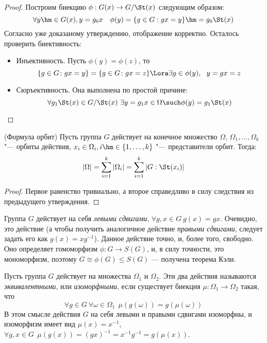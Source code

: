 \begin{proof}
	Построим биекцию $\phi: G(x) \to G / \St(x)$ следующим образом: 
	\[
		\forall y \hm\in G(x), y = g_0x \quad \phi(y) = \{g \in G: gx = y\} \hm= g_0\St(x)
	\]
	Согласно уже доказаному утверждению, отображение корректно. Осталось проверить биективность:
	\begin{itemize}
		\item Инъективность. Пусть $\phi(y) = \phi(z)$, то
		\[
			\{g \in G \colon gx = y\} = \{g \in G \colon gx = z\} \Lora \exists g \in \phi(y),\ \ y = gx = z
		\]
		
		\item Сюръективность. Она выполнена по простой причине:
		\[
			\forall g_1 \St(x) \in G / \St(x)\ \exists y = g_1 x \in \Omega \such \phi(y) = g_1 \St(x)
		\]
	\end{itemize}
\end{proof}

\begin{theorem} (Формула орбит)
	Пусть группа $G$ действует на конечное множество $\Omega$, $\Omega_1, \dotsc, \Omega_k$ "--- орбиты действия, $x_i \in \Omega_i, i \hm\in \{1, \dotsc, k\}$ "--- представители орбит. Тогда:
	\[|\Omega| = \sum\limits_{i = 1}^k|\Omega_i| = \sum\limits_{i = 1}^k|G : \St(x_i)|\]
\end{theorem}

\begin{proof}
	Первое равенство тривиально, а второе справедливо в силу следствия из предыдущего утверждения.
\end{proof}

\begin{example}
	Группа $G$ действует на себя \textit{левыми сдвигами}, $\forall g, x \in G\ g(x) = gx$. Очевидно, это действие (а чтобы получить аналогичное действие \textit{правыми сдвигами}, следует задать его как $g(x) = xg^{-1}$). Данное действие точно, и, более того, свободно. Оно определяет гомоморфизм $\phi \colon G \to S(G)$, и, в силу точности, это мономорфизм, поэтому $G \cong \phi(G) \le S(G)$ --- получена теорема Кэли.
\end{example}

\begin{note}
	Пусть группа $G$ действует на множества $\Omega_1$ и $\Omega_2$. Эти два действия называются \textit{эквивалентными}, или \textit{изоморфными}, если существует биекция $\mu \colon \Omega_1 \to \Omega_2$ такая, что 
	\[
		\forall g \in G\ \forall \omega \in \Omega_1\ \ \mu(g(\omega)) = g(\mu(\omega))
	\]
	В этом смысле действия $G$ на себя левыми и правыми сдвигами изоморфны, и изоморфизм имеет вид $\mu(x) = x^{-1}$, $\forall g, x \in G\ \ \mu(g(x)) = (gx)^{-1} = x^{-1}g^{-1} = g(\mu(x))$.
\end{note}

